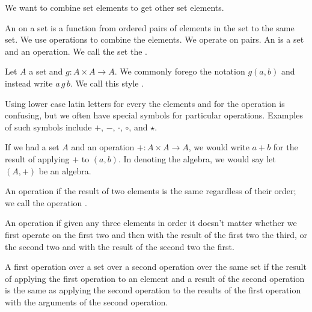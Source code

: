 
\sbasic





\sstart
{}


We want to combine set elements to get
other set elements.



An  on a set is
a function from ordered pairs of elements
in the set to the same set.
We use operations to combine the elements.
We operate on pairs.
An  is a set and
an operation.
We call the set the
.



Let $A$ a set and $g: A \times A \to A$.
We commonly forego the notation $g(a, b)$ and instead write $a\,g\,b$.
We call this style .

Using lower case latin letters for every the elements and for the operation is confusing, but we often have special symbols for particular operations.
Examples of such symbols include $+$, $-$, $\cdot$, $\circ$, and $\star$.

If we had a set $A$ and an operation $+: A \times A \to A$, we would write $a+b$ for the result of applying $+$ to $(a,b)$.
In denoting the algebra, we would say let $(A, +)$ be an algebra.


An operation  if
the result of two elements is the same
regardless of their order; we call the
operation .

An operation 
if given any three elements in order it
doesn't matter whether we first operate
on the first two and then with the result
of the first two the third, or the second
two and with the result of the second two
the first.

A first operation over a set
over a second operation over the same set
if the result of applying the first
operation to an element and a result of
the second operation is the same as
applying the second operation to the results
of the first operation with the arguments
of the second operation.



